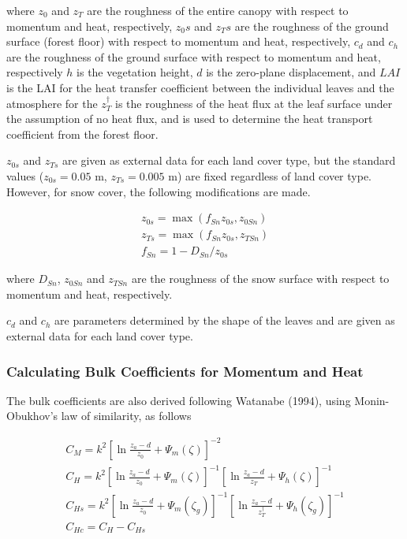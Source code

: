where \(z_0\) and \(z_T\) are the roughness of the entire canopy with
respect to momentum and heat, respectively, \(z_0s\) and \(z_Ts\) are
the roughness of the ground surface (forest floor) with respect to
momentum and heat, respectively, \(c_d\) and \(c_h\) are the roughness
of the ground surface with respect to momentum and heat, respectively
\(h\) is the vegetation height, \(d\) is the zero-plane displacement,
and \(LAI\) is the LAI for the heat transfer coefficient between the
individual leaves and the atmosphere for the \(z_T^{\dagger}\) is the
roughness of the heat flux at the leaf surface under the assumption of
no heat flux, and is used to determine the heat transport coefficient
from the forest floor.

\(z_{0s}\) and \(z_{Ts}\) are given as external data for each land cover
type, but the standard values (\(z_{0s}=0.05\) m, \(z_{Ts}=0.005\) m)
are fixed regardless of land cover type. However, for snow cover, the
following modifications are made.

\begin{eqnarray}
 z_{0s} = \max( f_{Sn} z_{0s}, z_{0Sn} ) \\
 z_{Ts} = \max( f_{Sn} z_{0s}, z_{TSn} ) \\
          f_{Sn} = 1 - D_{Sn} / z_{0s}
\end{eqnarray}

where \(D_{Sn}\), \(z_{0Sn}\) and \(z_{TSn}\) are the roughness of the
snow surface with respect to momentum and heat, respectively.

\(c_d\) and \(c_h\) are parameters determined by the shape of the leaves
and are given as external data for each land cover type.

\hypertarget{calculating-bulk-coefficients-for-momentum-and-heat}{%
\subsubsection{Calculating Bulk Coefficients for Momentum and
Heat}\label{calculating-bulk-coefficients-for-momentum-and-heat}}

The bulk coefficients are also derived following Watanabe (1994), using
Monin-Obukhov's law of similarity, as follows

\begin{eqnarray}
 C_M = k^2 \left[ \ln \frac{z_a-d}{z_0} + \Psi_m(\zeta) \right]^{-2} \\
 C_H = k^2 \left[ \ln \frac{z_a-d}{z_0} + \Psi_m(\zeta) \right]^{-1}
             \left[ \ln \frac{z_a-d}{z_T} + \Psi_h(\zeta) \right]^{-1} \\
 C_{Hs} = k^2 \left[ \ln \frac{z_a-d}{z_0} + \Psi_m(\zeta_g) \right]^{-1}
             \left[ \ln \frac{z_a-d}{z_T^{\dagger}} + \Psi_h(\zeta_g) \right]^{-1} \\
 C_{Hc} = C_H - C_{Hs}
\end{eqnarray}

